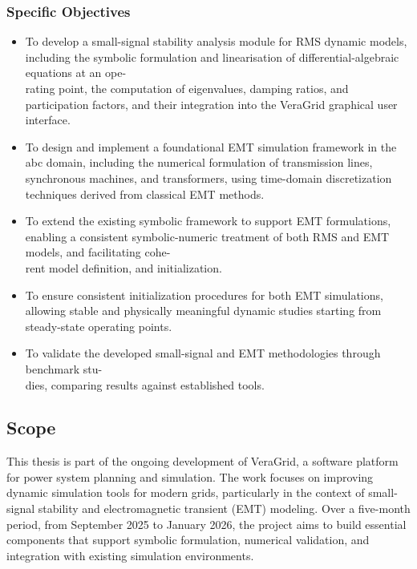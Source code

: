 \subsubsection*{Specific Objectives}

\begin{itemize}
    \item To develop a small-signal stability analysis module for RMS dynamic models,
    including the symbolic formulation and linearisation of differential-algebraic equations
    at an ope-\\rating point, the computation of eigenvalues, damping ratios, and participation
    factors, and their integration into the VeraGrid graphical user interface.

    \item To design and implement a foundational EMT simulation framework in the abc
    domain, including the numerical formulation of transmission lines, synchronous
    machines, and transformers, using time-domain discretization techniques derived
    from classical EMT methods.

    \item To extend the existing symbolic framework to support EMT formulations,
    enabling a consistent symbolic-numeric treatment of both RMS and EMT models,
    and facilitating cohe-\\rent model definition, and initialization.

    \item To ensure consistent initialization procedures for both EMT simulations,
    allowing stable and physically meaningful dynamic studies starting from steady-state
    operating points.

    \item To validate the developed small-signal and EMT methodologies through benchmark
    stu-\\dies, comparing results against established tools.
\end{itemize}

\subsection{Scope}

This thesis is part of the ongoing development of VeraGrid, a software platform for power system planning and simulation. 
The work focuses on improving dynamic simulation tools for modern grids, particularly in the context of small-signal stability and electromagnetic transient (EMT) modeling.
Over a five-month period, from September 2025 to January 2026, the project aims to build essential components that support symbolic formulation, numerical validation,
and integration with existing simulation environments. 

